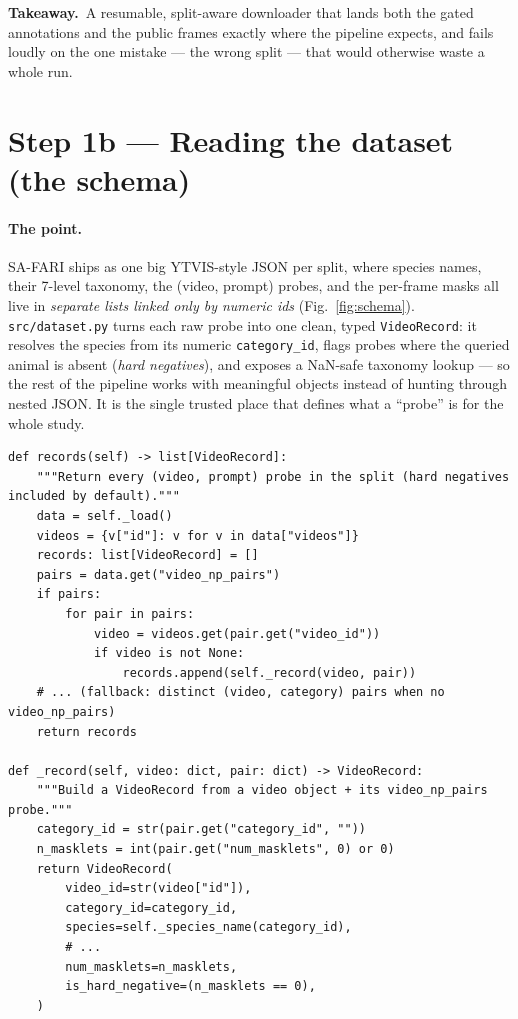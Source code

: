 \documentclass[11pt,a4paper]{article}
\newcommand{\code}[1]{\texttt{#1}}
\newcommand{\srcfile}[1]{\smallskip\noindent{\footnotesize\color{navy}\ttfamily\textbf{#1}}\par\nobreak\vspace{-0.15em}}
\newcommand{\takeaway}[1]{\smallskip\noindent%
  \colorbox{forest!8}{\parbox{\dimexpr\linewidth-2\fboxsep\relax}{%
  \small{\color{forest}\textbf{Takeaway.}}\ #1}}\smallskip}
\begin{document}
\takeaway{A resumable, split-aware downloader that lands both the gated annotations and the public frames
exactly where the pipeline expects, and fails loudly on the one mistake --- the wrong split --- that would
otherwise waste a whole run.}

\section{Step 1b --- Reading the dataset (the schema)}

\paragraph{The point.}
SA-FARI ships as one big YTVIS-style JSON per split, where species names, their 7-level taxonomy, the
(video, prompt) probes, and the per-frame masks all live in \emph{separate lists linked only by numeric
ids} (Fig.~\ref{fig:schema}). \code{src/dataset.py} turns each raw probe into one clean, typed
\code{VideoRecord}: it resolves the species from its numeric \code{category\_id}, flags probes where the
queried animal is absent (\emph{hard negatives}), and exposes a NaN-safe taxonomy lookup --- so the rest of
the pipeline works with meaningful objects instead of hunting through nested JSON. It is the single trusted
place that defines what a ``probe'' is for the whole study.

\srcfile{src/dataset.py}
\begin{lstlisting}[style=py]
def records(self) -> list[VideoRecord]:
    """Return every (video, prompt) probe in the split (hard negatives included by default)."""
    data = self._load()
    videos = {v["id"]: v for v in data["videos"]}
    records: list[VideoRecord] = []
    pairs = data.get("video_np_pairs")
    if pairs:
        for pair in pairs:
            video = videos.get(pair.get("video_id"))
            if video is not None:
                records.append(self._record(video, pair))
    # ... (fallback: distinct (video, category) pairs when no video_np_pairs)
    return records

def _record(self, video: dict, pair: dict) -> VideoRecord:
    """Build a VideoRecord from a video object + its video_np_pairs probe."""
    category_id = str(pair.get("category_id", ""))
    n_masklets = int(pair.get("num_masklets", 0) or 0)
    return VideoRecord(
        video_id=str(video["id"]),
        category_id=category_id,
        species=self._species_name(category_id),
        # ...
        num_masklets=n_masklets,
        is_hard_negative=(n_masklets == 0),
    )
\end{lstlisting}
\end{document}
